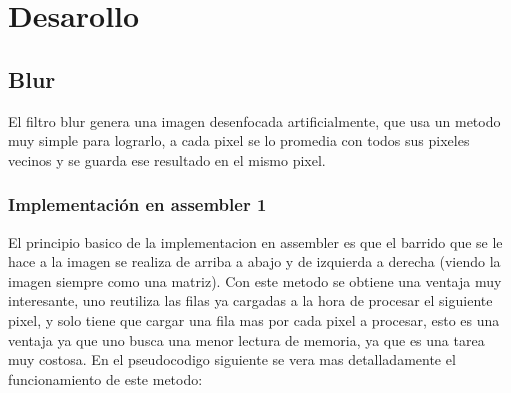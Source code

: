 \documentclass[a4paper]{article}
\begin{document}
\newpage 

\section{Desarollo}

%
%
\subsection{Blur}

El filtro blur genera una imagen desenfocada artificialmente, que usa un metodo muy simple para lograrlo, a cada pixel se lo promedia con todos sus pixeles vecinos y se guarda ese resultado en el mismo pixel.

\subsubsection{Implementación en assembler 1}

El principio basico de la implementacion en assembler es que el barrido que se le hace a la imagen se realiza de arriba a abajo y de izquierda a derecha (viendo la imagen siempre como una matriz). Con este metodo se obtiene una ventaja muy interesante, uno reutiliza las filas ya cargadas a la hora de procesar el siguiente pixel, y solo tiene que cargar una fila mas por cada pixel a procesar, esto es una ventaja ya que uno busca una menor lectura de memoria, ya que es una tarea muy costosa. En el pseudocodigo siguiente se vera mas detalladamente el funcionamiento de este metodo:

\end{document}
